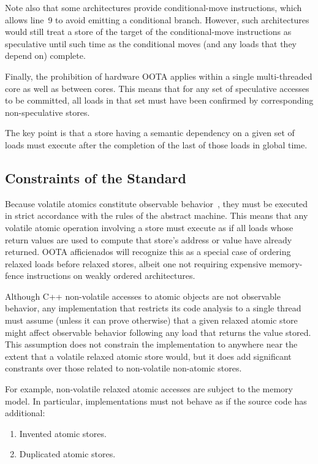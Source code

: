 \documentclass[10]{article}
\begin{document}
Note also that some architectures provide conditional-move instructions,
which allows line~9 to avoid emitting a conditional branch.
However, such architectures would still treat a store of the
target of the conditional-move instructions as speculative until
such time as the conditional moves (and any loads that they depend
on) complete.

Finally, the prohibition of hardware OOTA applies within a single
multi-threaded core as well as between cores.
This means that for any set of speculative accesses to be committed,
all loads in that set must have been confirmed by corresponding
non-speculative stores.

The key point is that a store having a semantic dependency on a given
set of loads must execute after the completion of the last of those
loads in global time.

\subsection{Constraints of the Standard}
\label{sec:Constraints of the Standard}

Because volatile atomics constitute observable
behavior~\cite[]{ThomasKoeppe2023N4950},
they must be executed in strict accordance with the rules of the abstract
machine.
This means that any volatile atomic operation involving a store
must execute as if all loads whose return values are used to compute
that store's address or value have already returned.
OOTA afficienados will recognize this as a special case of ordering
relaxed loads before relaxed stores, albeit one not requiring
expensive memory-fence instructions on weakly ordered architectures.

Although C++ non-volatile accesses to atomic objects are not observable
behavior, any implementation that restricts its code analysis to a
single thread must assume (unless it can prove otherwise) that a given
relaxed atomic store might affect observable behavior following any
load that returns the value stored.
This assumption does not constrain the implementation to anywhere near
the extent that a volatile relaxed atomic store would, but it does add
significant constrants over those related to non-volatile non-atomic
stores.

For example, non-volatile relaxed atomic accesses are subject to the
memory model.
In particular, implementations must not behave as if the source code has
additional:

\begin{enumerate}
\item	Invented atomic stores.
\item	Duplicated atomic stores.
\end{enumerate}
\end{document}
